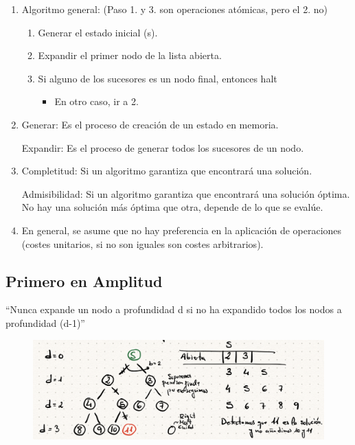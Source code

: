 \documentclass[12pt, twoside, openright]{report} %
\begin{document}
  \begin{enumerate}
  \item
    Algoritmo general: (Paso 1. y 3. son operaciones atómicas, pero el
    2. no)

    \begin{enumerate}
  
    \item
      Generar el estado inicial (s).
    \item
      Expandir el primer nodo de la lista abierta.
    \item
      Si alguno de los sucesores es un nodo final, entonces halt

      \begin{itemize}
    
      \item
        En otro caso, ir a 2.
      \end{itemize}
    \end{enumerate}
  \item
    Generar: Es el proceso de creación de un estado en memoria.

    Expandir: Es el proceso de generar todos los sucesores de un nodo.
  \item
    Completitud: Si un algoritmo garantiza que encontrará una solución.

    Admisibilidad: Si un algoritmo garantiza que encontrará una solución
    óptima. No hay una solución más óptima que otra, depende de lo que
    se evalúe.
  \item
    En general, se asume que no hay preferencia en la aplicación de
    operaciones (costes unitarios, si no son iguales son costes
    arbitrarios).
  \end{enumerate}
\subsection{Primero en Amplitud}

  ``Nunca expande un nodo a profundidad d si no ha expandido todos los
  nodos a profundidad (d-1)''

  \begin{figure}[H]
	{\includegraphics[scale=.25]{Untitled 46.png}}
\end{figure}
\end{document}
